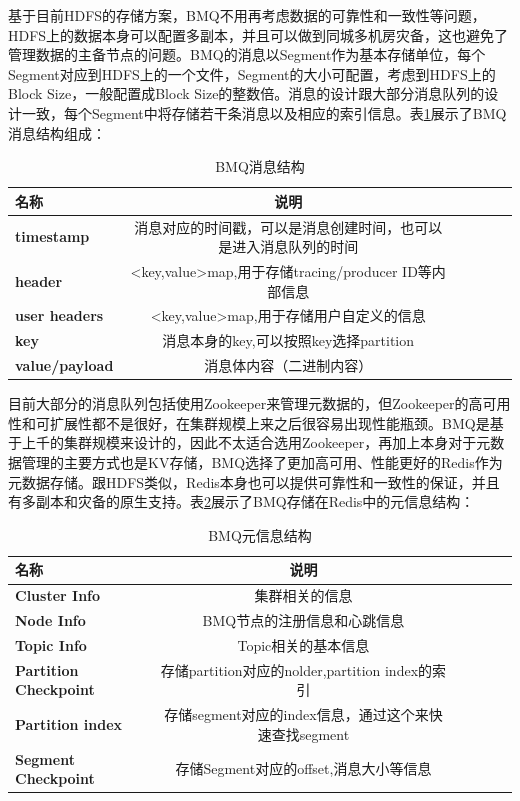 基于目前HDFS的存储方案，BMQ不用再考虑数据的可靠性和一致性等问题，HDFS上的数据本身可以配置多副本，并且可以做到同城多机房灾备，这也避免了管理数据的主备节点的问题。BMQ的消息以Segment作为基本存储单位，每个Segment对应到HDFS上的一个文件，Segment的大小可配置，考虑到HDFS上的Block Size，一般配置成Block Size的整数倍。消息的设计跟大部分消息队列的设计一致，每个Segment中将存储若干条消息以及相应的索引信息。表\ref{table:BMQInfo}展示了BMQ消息结构组成：

\begin{table}[htb]\footnotesize
\centering
\caption{BMQ消息结构}
\vspace{2mm}
\begin{tabular}{lccccc}
\toprule
\textbf{名称}&\textbf{说明}\\
\midrule
\textbf{timestamp}&消息对应的时间戳，可以是消息创建时间，也可以是进入消息队列的时间\\ \hline
\textbf{header}&<key,value>map,用于存储tracing/producer ID等内部信息\\ \hline
\textbf{user headers}&<key,value>map,用于存储用户自定义的信息\\ \hline
\textbf{key}&消息本身的key,可以按照key选择partition\\ \hline
\textbf{value/payload}&消息体内容（二进制内容）\\ \hline
\bottomrule
\end{tabular}
\label{table:BMQInfo}
\end{table}

目前大部分的消息队列包括使用Zookeeper来管理元数据的，但Zookeeper的高可用性和可扩展性都不是很好，在集群规模上来之后很容易出现性能瓶颈。BMQ是基于上千的集群规模来设计的，因此不太适合选用Zookeeper，再加上本身对于元数据管理的主要方式也是KV存储，BMQ选择了更加高可用、性能更好的Redis作为元数据存储。跟HDFS类似，Redis本身也可以提供可靠性和一致性的保证，并且有多副本和灾备的原生支持。表\ref{table:BMQMetaInfo}展示了BMQ存储在Redis中的元信息结构：
\begin{table}[htb]\footnotesize
\centering
\caption{BMQ元信息结构}
\vspace{2mm}
\begin{tabular}{lccccc}
\toprule
\textbf{名称}&\textbf{说明}\\
\midrule
\textbf{Cluster Info}&集群相关的信息\\ \hline
\textbf{Node Info}&BMQ节点的注册信息和心跳信息\\ \hline
\textbf{Topic Info}&Topic相关的基本信息\\ \hline
\textbf{Partition Checkpoint}&存储partition对应的nolder,partition index的索引\\ \hline
\textbf{Partition index}&存储segment对应的index信息，通过这个来快速查找segment\\ \hline
\textbf{Segment Checkpoint}&存储Segment对应的offset,消息大小等信息\\ \hline
\bottomrule
\end{tabular}
\label{table:BMQMetaInfo}
\end{table}

